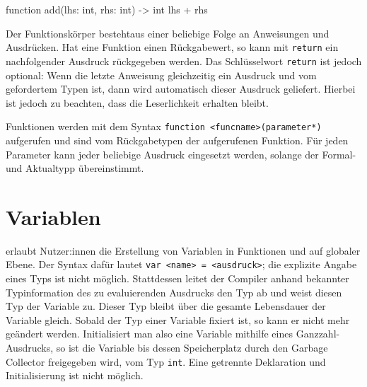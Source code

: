 \begin{ToyaCode}[numbers=none, caption={Eine typische Funktion unter toya.}]
function add(lhs: int, rhs: int) -> int {
    lhs + rhs
}
\end{ToyaCode}

Der Funktionskörper bestehtaus einer beliebige Folge an Anweisungen und Ausdrücken. Hat eine Funktion einen Rückgabewert, so kann mit \texttt{return} ein nachfolgender Ausdruck rückgegeben werden. Das Schlüsselwort \texttt{return} ist jedoch optional: Wenn die letzte Anweisung gleichzeitig ein Ausdruck und vom gefordertem Typen ist, dann wird automatisch dieser Ausdruck geliefert. Hierbei ist jedoch zu beachten, dass die Leserlichkeit erhalten bleibt.

Funktionen werden mit dem Syntax \texttt{function <funcname>(parameter*)} aufgerufen und sind vom Rückgabetypen der aufgerufenen Funktion. Für jeden Parameter kann jeder beliebige Ausdruck eingesetzt werden, solange der Formal- und Aktualtypp übereinstimmt.


\section{Variablen}
\toya erlaubt Nutzer:innen die Erstellung von Variablen in Funktionen und auf globaler Ebene. Der Syntax dafür lautet \texttt{var <name> = <ausdruck>}; die explizite Angabe eines Typs ist nicht möglich. Stattdessen leitet der Compiler anhand bekannter Typinformation des zu evaluierenden Ausdrucks den Typ ab und weist diesen Typ der Variable zu. Dieser Typ bleibt über die gesamte Lebensdauer der Variable gleich. Sobald der Typ einer Variable fixiert ist, so kann er nicht mehr geändert werden. Initialisiert man also eine Variable mithilfe eines Ganzzahl-Ausdrucks, so ist die Variable bis dessen Speicherplatz durch den Garbage Collector freigegeben wird, vom Typ \texttt{int}. Eine getrennte Deklaration und Initialisierung ist nicht möglich.

